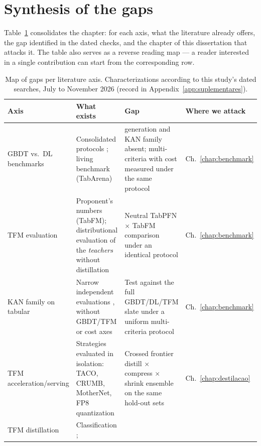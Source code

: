 \section{Synthesis of the gaps}
\label{sec:rel-sintese}

Table~\ref{tab:lacunas} consolidates the chapter: for each axis,
what the literature already offers, the gap identified in the dated
checks, and the chapter of this dissertation that attacks it. The
table also serves as a reverse reading map --- a reader interested
in a single contribution can start from the corresponding row.

\begin{table}[htbp]
\centering
\caption[Map of gaps per literature axis]{Map of gaps per literature
axis. Characterizations according to this study's dated searches,
July to November 2026 (record in
Appendix~\ref{app:suplementares}).}
\label{tab:lacunas}
\small
\begin{tabular}{>{\raggedright\arraybackslash}p{}>{\raggedright\arraybackslash}p{}>{\raggedright\arraybackslash}p{}>{\raggedright\arraybackslash}p{}}
\toprule
\textbf{Axis} & \textbf{What exists} & \textbf{Gap} & \textbf{Where we attack} \\
\midrule
GBDT vs.\ DL benchmarks &
Consolidated protocols \citep{grinsztajn2022,mcelfresh2023,gorishniy2021};
living benchmark (TabArena) &
2026 generation and KAN family absent; multi-criteria with cost
measured under the same protocol &
Ch.~\ref{chap:benchmark} \\
\addlinespace
TFM evaluation &
Proponent's numbers (TabFM); distributional evaluation of the
\emph{teachers} without distillation
\citep{izbicki2026,landsgesell2026,scoringbench2026} &
Neutral TabPFN $\times$ TabFM comparison under an identical protocol &
Ch.~\ref{chap:benchmark} \\
\addlinespace
KAN family on tabular &
Narrow independent evaluations \citep{poeta2024,kancritical2024},
without GBDT/TFM or cost axes &
Test against the full GBDT/DL/TFM slate under a uniform
multi-criteria protocol &
Ch.~\ref{chap:benchmark} \\
\addlinespace
TFM acceleration/serving &
Strategies evaluated in isolation: TACO, CRUMB, MotherNet, FP8
quantization \citep{taco2026,crumb2026,mothernet2023,kubler2026} &
Crossed frontier distill $\times$ compress $\times$ shrink ensemble
on the same hold-out sets &
Ch.~\ref{chap:destilacao} \\
\addlinespace
TFM distillation &
Classification \citep{pocketfm2026,pocketfmhealth2026,gear2026};

\end{tabular}
\end{table}
